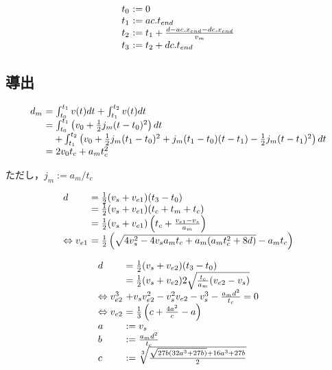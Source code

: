 \documentclass[a5paper]{ltjsarticle}
\begin{document}
$$
    \begin{array}{l@{~}l}
        t_0 & := 0
        \\
        t_1 & := ac.t_{end}
        \\
        t_2 & := t_1 +             \frac{d - ac.x_{end} - dc.x_{end}}{v_m}
        \\
        t_3 & := t_2 + dc.t_{end}
    \end{array}
$$

\subsection{導出}

$$
    \begin{array}{l@{~}l}
        d_m & =                  \int_{t_0}^{t_1}v(t) dt + \int_{t_1}^{t_2}v(t) dt
        \\
            & =                  \int_{t_0}^{t_1}\left( v_0+\frac{1}{2} j_m(t-t_0)^2 \right) dt
        \\
            & \quad+ \int_{t_1}^{t_2}\left(
        v_0+                     \frac{1}{2} j_m(t_1-t_0)^2
        +j_m(t_1-t_0)(t-t_1) -   \frac{1}{2}j_m(t-t_1)^2
        \right) dt
        \\
            & = 2v_0t_c+a_mt_c^2
    \end{array}
$$

ただし，$j_m:=a_m/t_c$

$$
    \begin{array}{l@{~}l}
        d                      & = \frac{1}{2}(v_s+v_{e1})(t_3-t_0)
        \\
                               & = \frac{1}{2}(v_s+v_{e1})(t_c+t_m+t_c)
        \\
                               & = \frac{1}{2}(v_s+v_{e1})\left(t_c+\frac{v_{e1}-v_s}{a_m}\right)
        \\
        \Leftrightarrow v_{e1} & =
        \frac{1}{2}\left(\sqrt{4v_s^2-4v_sa_mt_c+a_m(a_mt_c^2+8d)}-a_mt_c\right)
    \end{array}
$$

$$
    \begin{array}{l@{~}l}
        d        & =                                                         \frac{1}{2}(v_s+v_{e2})(t_3-t_0)
        \\
                 & =                                                         \frac{1}{2}(v_s+v_{e2})2\sqrt{\frac{t_c}{a_m}(v_{e2}-v_s)}
        \\
        \Leftrightarrow
        v_{e2}^3 & + v_s v_{e2}^2-v_s^2v_{e2}-v_s^3-\frac{a_md^2}{t_c} = 0
        \\
        \Leftrightarrow
        v_{e2}   & =
        \frac{1}{3}\left(c +\frac{4a^2}{c}
        -a
        \right)
        \\
        a        & := v_s
        \\
        b        & :=                                                        \frac{a_md^2}{t_c}
        \\
        c        & :=                                                        \sqrt[3]{\frac{\sqrt{27b(32a^3+27b)} + 16a^3+27b}{2}}
    \end{array}
$$
\end{document}
